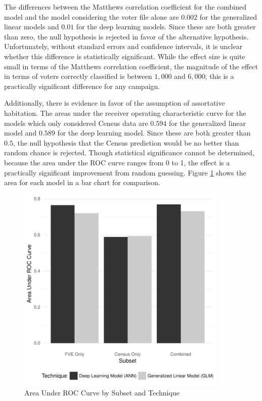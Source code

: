 \documentclass[12pt]{article}
\begin{document}
The differences between the Matthews correlation coefficient for the combined model and the model considering the voter file alone are $0.002$ for the generalized linear models and $0.01$ for the deep learning models. Since these are both greater than zero, the null hypothesis is rejected in favor of the alternative hypothesis. Unfortunately, without standard errors and confidence intervals, it is unclear whether this difference is statistically significant. While the effect size is quite small in terms of the Matthews correlation coefficient, the magnitude of the effect in terms of voters correctly classified is between $1,000$ and $6,000$; this is a practically significant difference for any campaign.

Additionally, there is evidence in favor of the assumption of assortative habitation. The areas under the receiver operating characteristic curve for the models which only considered Census data are $0.594$ for the generalized linear model and $0.589$ for the deep learning model. Since these are both greater than $0.5$, the null hypothesis that the Census prediction would be no better than random chance is rejected. Though statistical significance cannot be determined, because the area under the ROC curve ranges from 0 to 1, the effect is a practically significant improvement from random guessing. Figure \ref{auroc} shows the area for each model in a bar chart for comparison.

\begin{figure}
\centering \caption{Area Under ROC Curve by Subset and Technique} \label{auroc}
\includegraphics[width=10cm]{Graphic002.pdf}
\end{figure}
\end{document}
